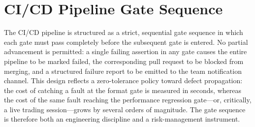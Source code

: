 \documentclass[12pt,openany]{book}
\numberwithin{equation}{chapter}
\theoremstyle{plain}
\theoremstyle{definition}
\theoremstyle{remark}
\begin{document}
\section{CI/CD Pipeline Gate Sequence}

The CI/CD pipeline is structured as a strict, sequential gate sequence in which each gate must pass completely before the subsequent gate is entered. No partial advancement is permitted: a single failing assertion in any gate causes the entire pipeline to be marked failed, the corresponding pull request to be blocked from merging, and a structured failure report to be emitted to the team notification channel. This design reflects a zero-tolerance policy toward defect propagation: the cost of catching a fault at the format gate is measured in seconds, whereas the cost of the same fault reaching the performance regression gate—or, critically, a live trading session—grows by several orders of magnitude. The gate sequence is therefore both an engineering discipline and a risk-management instrument.
\end{document}
